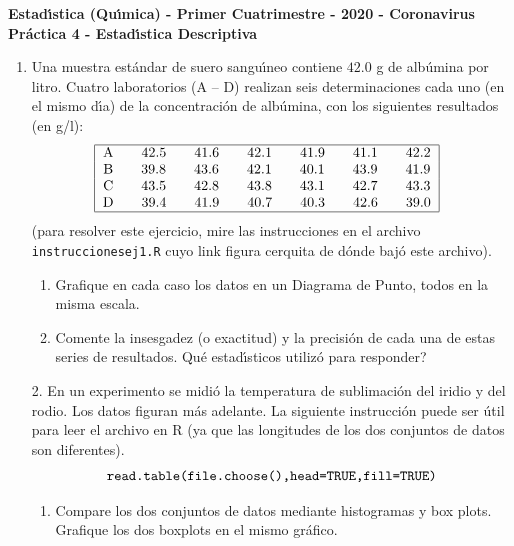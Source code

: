 \documentclass[11pt,a4paper,twoside]{article}%
\begin{document}
\begin{center}
\textbf{\textsf{Estad\'{\i}stica (Qu\'{\i}mica) - Primer Cuatrimestre - 2020 - Coronavirus}}\\

\textbf{Pr\'{a}ctica 4 - Estad\'{\i}stica Descriptiva\vspace{-0.1in}}
\end{center}

\begin{enumerate}
\item Una muestra est\'{a}ndar de suero sangu\'{\i}neo contiene $42.0$ g de
alb\'{u}mina por litro. Cuatro laboratorios (A -- D) realizan seis
determinaciones cada uno (en el mismo d\'{\i}a) de la concentraci\'{o}n de
alb\'{u}mina, con los siguientes resultados (en g/l):%
\[%
\begin{tabular}
[c]{|c|}\hline
A\qquad42.5\qquad41.6\qquad42.1\qquad41.9\qquad41.1\qquad42.2\\
B\qquad39.8\qquad43.6\qquad42.1\qquad40.1\qquad43.9\qquad41.9\\
C\qquad43.5\qquad42.8\qquad43.8\qquad43.1\qquad42.7\qquad43.3\\
D\qquad39.4\qquad41.9\qquad40.7\qquad40.3\qquad42.6\qquad39.0\\\hline
\end{tabular}
\ \
\]
(para resolver este ejercicio, mire las instrucciones en el archivo
\texttt{instruccionesej1.R} cuyo link figura cerquita de d\'{o}nde baj\'{o}
este archivo).

\begin{enumerate}
\item Grafique en cada caso los datos en un Diagrama de Punto, todos en la
misma escala.

\item Comente la insesgadez (o exactitud) y la precisi\'{o}n de cada una de
estas series de resultados. \textquestiondown Qu\'{e} estad\'{\i}sticos
utiliz\'{o} para responder?
\end{enumerate}

\item[2.] En un experimento se midi\'{o} la temperatura de sublimaci\'{o}n del
iridio y del rodio. Los datos figuran m\'{a}s adelante. La siguiente
instrucci\'{o}n puede ser \'{u}til para leer el archivo en R (ya que las
longitudes de los dos conjuntos de datos son diferentes).%
\[
\text{\texttt{read.table(file.choose(),head=TRUE,fill=TRUE)}}%
\]


\begin{enumerate}
\item Compare los dos conjuntos de datos mediante histogramas y box plots.
Grafique los dos boxplots en el mismo gr\'{a}fico.


\end{enumerate}
\end{enumerate}
\end{document}
